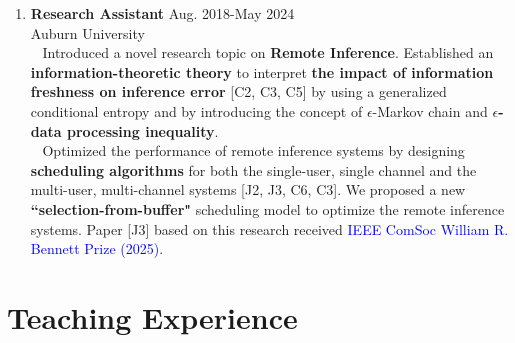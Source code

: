 \documentclass[letterpaper,11pt]{article}
\begin{document}
\begin{enumerate}[label=\arabic*, leftmargin=*, topsep=2pt, itemsep=0pt]
      \vspace{2pt}
   \textopenbullet~ Jointly optimized {\bf communication scheduling and feature computation} to improve the performance of multi-task remote inference systems [J7, C7].
   
   
   \vspace{5pt}
    \item {\bf Research Assistant} \hfill Aug. 2018-May 2024\\
    Auburn University \\
   \textopenbullet~ Introduced a novel research topic on {\bf Remote Inference}. Established an {\bf information-theoretic theory} to interpret {\bf the impact of information freshness on inference error} [C2, C3, C5] by using a generalized conditional entropy and by introducing the concept of $\epsilon$-Markov chain and {\bf $\epsilon$-data processing inequality}. \\
   \textopenbullet~ Optimized the performance of remote inference systems by designing {\bf scheduling algorithms} for both the single-user, single channel and the multi-user, multi-channel systems [J2, J3, C6, C3]. We proposed a new {\bf ``selection-from-buffer"} scheduling model to optimize the remote inference systems. Paper [J3] based on this research received \textcolor{blue}{IEEE ComSoc William R. Bennett Prize (2025)}.
\end{enumerate}

\section{Teaching Experience}

\end{document}

